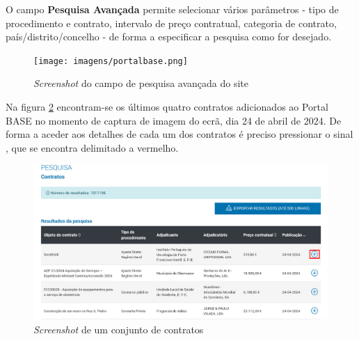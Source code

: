 O campo \textbf{Pesquisa Avançada} permite selecionar vários parâmetros - tipo de procedimento e contrato, intervalo de preço contratual, categoria de contrato, país/distrito/concelho - de forma a especificar a pesquisa como for desejado. 

\begin{figure}[H]
	\centering
	\texttt{[image: imagens/portalbase.png]}
	\caption{\textit{Screenshot} do campo de pesquisa avançada do site}
	\label{fig:site2}
\end{figure}

Na figura \ref{fig:site3} encontram-se os últimos quatro contratos adicionados ao Portal BASE no momento de captura de imagem do ecrã, dia 24 de abril de 2024. De forma a aceder aos detalhes de cada um dos contratos é preciso pressionar o sinal  , que se encontra delimitado a vermelho. 

\begin{figure}[H]
	\centering
	\includegraphics[width=.95\textwidth]{imagens/portalbase_pesquisa.png}
	\caption{\textit{Screenshot} de um conjunto de contratos}
	\label{fig:site3}
\end{figure}


